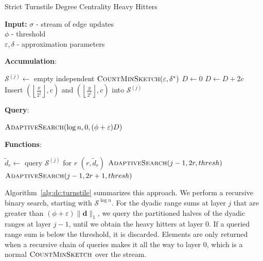 \documentclass[10]{report}
\newcommand{\algoname}[1]{\textnormal{\textsc{#1}}}
\begin{document}
\begin{algorithm}[htbp] 
\caption{Strict Turnstile Degree Centrality Heavy Hitters}\label{alg:dc:turnstile}
\begin{flushleft}
        \textbf{Input:} 		$\sigma$ - stream of edge updates\\
        	\hspace{3.2em}	$\phi$ - threshold\\
        	\hspace{3.2em}	$\varepsilon, \delta$ - approximation parameters\\
\end{flushleft}
\textbf{Accumulation}:
\begin{algorithmic}[1]
		\State $\mathcal{S}^{(j)} \gets $ empty independent $\algoname{CountMinSketch}(\varepsilon, \delta^*)$
	\EndFor
	\State $D \gets 0$
		\State $D \gets D + 2c$
			\State Insert $\left ( \left \lfloor \frac{x}{2^j} \right \rfloor, c \right )$ and $\left ( \left \lfloor \frac{y}{2^j} \right \rfloor, c \right )$ into $\mathcal{S}^{(j)}$
		\EndFor
	\EndFor
\end{algorithmic}
\textbf{Query}:
\begin{algorithmic}[1]
	\State \Return $\algoname{AdaptiveSearch}(\log n, 0, (\phi + \varepsilon) D)$
\end{algorithmic}
\textbf{Functions}:
\begin{algorithmic}[1]
		\State $\widetilde{d}_r \gets $ query $\mathcal{S}^{(j)}$ for $r$
				\State \Return $\left ( r, \widetilde{d}_r \right )$
			\Else 
				\State $\algoname{AdaptiveSearch}(j - 1, 2r, thresh)$
				\State $\algoname{AdaptiveSearch}(j - 1, 2r + 1, thresh)$
			\EndIf
		\EndIf
	\EndFunction
\end{algorithmic}
\end{algorithm}

Algorithm~\ref{alg:dc:turnstile} summarizes this approach.
We perform a recursive binary search, starting with $\mathcal{S}^{\log n}$.
For the dyadic range sums at layer $j$ that are greater than $(\phi + \varepsilon) \|\mathbf{d}\|_1$, we query the partitioned halves of the dyadic ranges at layer $j-1$, until we obtain the heavy hitters at layer $0$.  
If a queried range sum is below the threshold, it is discarded. 
Elements are only returned when a recursive chain of queries makes it all the way to layer $0$, which is a normal $\algoname{CountMinSketch}$ over the stream.
\end{document}

